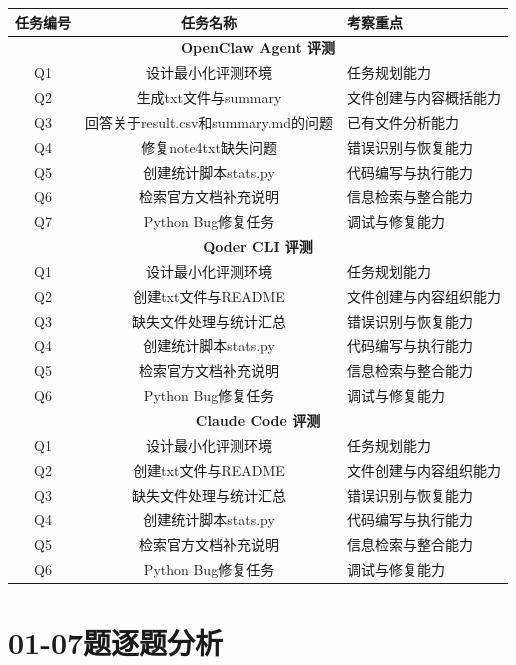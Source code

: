 \documentclass[a4paper]{article}
\begin{document}
\begin{table}[H]
\centering
\begin{tabular}{|c|c|p{6cm}|}
\hline
任务编号 & 任务名称 & 考察重点 \\
\hline
\multicolumn{3}{|c|}{\textbf{OpenClaw Agent 评测}} \\
\hline
Q1 & 设计最小化评测环境 & 任务规划能力 \\
\hline
Q2 & 生成txt文件与summary & 文件创建与内容概括能力 \\
\hline
Q3 & 回答关于result.csv和summary.md的问题 & 已有文件分析能力 \\
\hline
Q4 & 修复note4txt缺失问题 & 错误识别与恢复能力 \\
\hline
Q5 & 创建统计脚本stats.py & 代码编写与执行能力 \\
\hline
Q6 & 检索官方文档补充说明 & 信息检索与整合能力 \\
\hline
Q7 & Python Bug修复任务 & 调试与修复能力 \\
\hline
\multicolumn{3}{|c|}{\textbf{Qoder CLI 评测}} \\
\hline
Q1 & 设计最小化评测环境 & 任务规划能力 \\
\hline
Q2 & 创建txt文件与README & 文件创建与内容组织能力 \\
\hline
Q3 & 缺失文件处理与统计汇总 & 错误识别与恢复能力 \\
\hline
Q4 & 创建统计脚本stats.py & 代码编写与执行能力 \\
\hline
Q5 & 检索官方文档补充说明 & 信息检索与整合能力 \\
\hline
Q6 & Python Bug修复任务 & 调试与修复能力 \\
\hline
\multicolumn{3}{|c|}{\textbf{Claude Code 评测}} \\
\hline
Q1 & 设计最小化评测环境 & 任务规划能力 \\
\hline
Q2 & 创建txt文件与README & 文件创建与内容组织能力 \\
\hline
Q3 & 缺失文件处理与统计汇总 & 错误识别与恢复能力 \\
\hline
Q4 & 创建统计脚本stats.py & 代码编写与执行能力 \\
\hline
Q5 & 检索官方文档补充说明 & 信息检索与整合能力 \\
\hline
Q6 & Python Bug修复任务 & 调试与修复能力 \\
\hline
\end{tabular}
\end{table}

\section{01-07题逐题分析}
\end{document}
